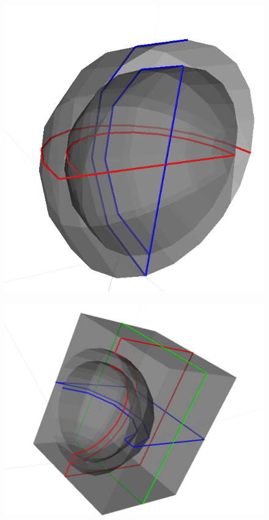 \documentclass[12pt,a4paper]{article}
\begin{document}
\begin{figure}[h!]
\centering
\begin{minipage}{.4\textwidth}
  \centering
  \includegraphics[height=1\linewidth]{Images//Booleans/SphereUnion.png}
  \label{uni}
\end{minipage}%
\begin{minipage}{.4\textwidth}
  \centering
  \includegraphics[height=1\linewidth]{Images//Booleans//SphereSubtraction.png}
  \label{sub}
\end{minipage}%
\end{figure}
\end{document}

